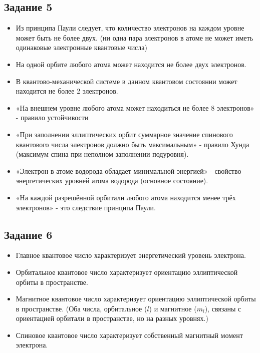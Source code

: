 \documentclass[../main.tex]{subfiles}
\begin{document}
\subsection{Задание 5}
\begin{itemize}
    \item Из принципа Паули следует, что количество электронов на каждом уровне может быть не более двух. (ни одна пара электронов в атоме не может иметь одинаковые электронные квантовые числа)
    \item На одной орбите любого атома может находится не более двух электронов.
    \item В квантово-механической системе в данном квантовом состоянии может находится не более 2 электронов.
    \item «На внешнем уровне любого атома может находиться не более 8 электронов» - правило устойчивости
    \item «При заполнении эллиптических орбит суммарное значение спинового квантового числа электронов должно быть максимальным» - правило Хунда (максимум спина при неполном заполнении подуровня).
    \item «Электрон в атоме водорода обладает минимальной энергией» - свойство энергетических уровней атома водорода (основное состояние).
    \item «На каждой разрешённой орбитали любого атома находится менее трёх электронов» - это следствие принципа Паули.
\end{itemize}

\subsection{Задание 6}
\begin{itemize}
    \item Главное квантовое число характеризует энергетический уровень электрона.
    \item Орбитальное квантовое число характеризует ориентацию эллиптической орбиты в пространстве.
    \item Магнитное квантовое число характеризует ориентацию эллиптической орбиты в пространстве. (Оба числа, орбитальное ($l$) и магнитное ($m_l$), связаны с ориентацией орбитали в пространстве, но на разных уровнях.)
    \item Спиновое квантовое число характеризует собственный магнитный момент электрона.
\end{itemize}
\end{document}
